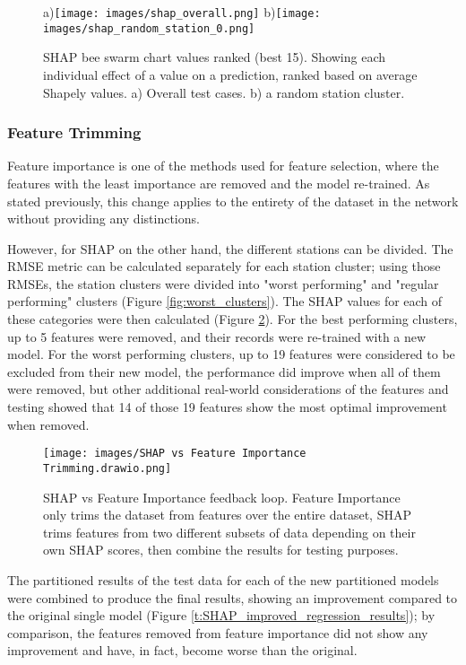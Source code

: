 \documentclass{article}
\begin{document}
\begin{figure}
\centering
a)\texttt{[image: images/shap\_overall.png]}
b)\texttt{[image: images/shap\_random\_station\_0.png]}
\caption{SHAP bee swarm chart values ranked (best 15). Showing each individual effect of a value on a prediction, ranked based on average Shapely values. a) Overall test cases. b) a random station cluster.}
\label{fig:shap_overall}
\end{figure}


\subsubsection{Feature Trimming}

Feature importance is one of the methods used for feature selection, where the features with the least importance are removed and the model re-trained. As stated previously, this change applies to the entirety of the dataset in the network without providing any distinctions.

However, for SHAP on the other hand, the different stations can be divided. The RMSE metric can be calculated separately for each station cluster; using those RMSEs, the station clusters were divided into "worst performing" and "regular performing" clusters (Figure \ref{fig:worst_clusters}). The SHAP values for each of these categories were then calculated (Figure \ref{fig:SHAP_vs_importance}). For the best performing clusters, up to 5 features were removed, and their records were re-trained with a new model. For the worst performing clusters, up to 19 features were considered to be excluded from their new model, the performance did improve when all of them were removed, but other additional real-world considerations of the features and testing showed that 14 of those 19 features show the most optimal improvement when removed.

\begin{figure}
\centering
\texttt{[image: images/SHAP vs Feature Importance Trimming.drawio.png]}
\caption{SHAP vs Feature Importance feedback loop. Feature Importance only trims the dataset from features over the entire dataset, SHAP trims features from two different subsets of data depending on their own SHAP scores, then combine the results for testing purposes.}
\label{fig:SHAP_vs_importance}
\end{figure}

The partitioned results of the test data for each of the new partitioned models were combined to produce the final results, showing an improvement compared to the original single model (Figure \ref{t:SHAP_improved_regression_results}); by comparison, the features removed from feature importance did not show any improvement and have, in fact, become worse than the original.
\end{document}
